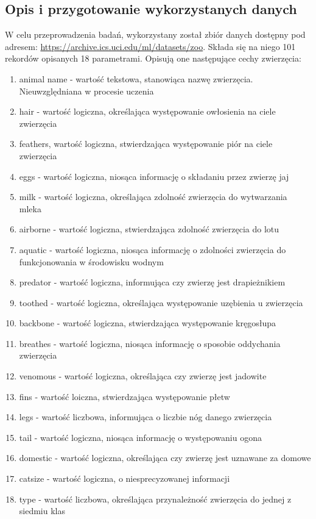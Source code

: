 \documentclass[12pt,twoside]{article}
\begin{document}
\subsection{Opis i przygotowanie wykorzystanych danych}
W celu przeprowadzenia badań, wykorzystany został zbiór danych\cite{dataset} dostępny pod adresem: \url{https://archive.ics.uci.edu/ml/datasets/zoo}.
Składa się na niego 101 rekordów opisanych 18 parametrami. Opisują one następujące cechy zwierzęcia:
\begin{enumerate}
	\item animal name - wartość tekstowa, stanowiąca nazwę zwierzęcia. Nieuwzględniana w procesie uczenia
	\item hair - wartość logiczna, określająca występowanie owłosienia na ciele zwierzęcia
	\item feathers, wartość logiczna, stwierdzająca występowanie piór na ciele zwierzęcia
	\item eggs - wartość logiczna, niosąca informację o składaniu przez zwierzę jaj
	\item milk - wartość logiczna, określająca zdolność zwierzęcia do wytwarzania mleka
	\item airborne - wartość logiczna, stwierdzająca zdolność zwierzęcia do lotu
	\item aquatic - wartość logiczna, niosąca informację o zdolności zwierzęcia do funkcjonowania w środowisku wodnym
	\item predator - wartość logiczna, informująca czy zwierzę jest drapieżnikiem
	\item toothed - wartość logiczna, określająca występowanie uzębienia u zwierzęcia
	\item backbone - wartość logiczna, stwierdzająca występowanie kręgosłupa
	\item breathes - wartość logiczna, niosąca informację o sposobie oddychania zwierzęcia
	\item venomous - wartość logiczna, określająca czy zwierzę jest jadowite
	\item fins - wartość loiczna, stwierdzająca występowanie płetw
	\item legs - wartość liczbowa, informująca o liczbie nóg danego zwierzęcia
	\item tail - wartość logiczna, niosąca informację o występowaniu ogona
	\item domestic - wartość logiczna, określająca czy zwierzę jest uznawane za domowe
	\item catsize - wartość logiczna, o niesprecyzowanej informacji
	\item type - wartość liczbowa, określająca przynależność zwierzęcia do jednej z siedmiu klas
\end{enumerate}
\end{document}
